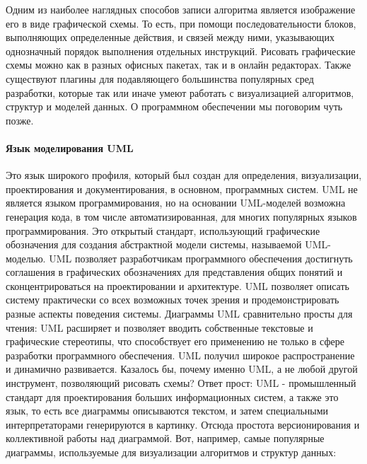 \documentclass[fontsize=14bp]{report}
\begin{document}
Одним из наиболее наглядных способов записи алгоритма является изображение его в виде графической схемы. То есть, при помощи последовательности блоков, выполняющих определенные действия, и связей между ними, указывающих однозначный порядок выполнения отдельных инструкций. Рисовать графические схемы можно как в разных офисных пакетах, так и в онлайн редакторах. Также существуют плагины для подавляющего большинства популярных сред разработки, которые так или иначе умеют работать с визуализацией алгоритмов, структур и моделей данных. О программном обеспечении мы поговорим чуть позже.
\paragraph{Язык моделирования UML} Это язык широкого профиля, который был создан для определения, визуализации, проектирования и документирования, в основном, программных систем. UML не является языком программирования, но на основании UML-моделей возможна генерация кода, в том числе автоматизированная, для многих популярных языков программирования. Это открытый стандарт, использующий графические обозначения для создания абстрактной модели системы, называемой UML-моделью. UML позволяет разработчикам программного обеспечения достигнуть соглашения в графических обозначениях для представления общих понятий и сконцентрироваться на проектировании и архитектуре. 
UML позволяет описать систему практически со всех возможных точек зрения и продемонстрировать разные аспекты поведения системы. Диаграммы UML сравнительно просты для чтения: UML расширяет и позволяет вводить собственные текстовые и графические стереотипы, что способствует его применению не только в сфере разработки программного обеспечения. UML получил широкое распространение и динамично развивается. Казалось бы, почему именно UML, а не любой другой инструмент, позволяющий рисовать схемы? Ответ прост: UML - промышленный стандарт для проектирования больших информационных систем, а также это язык, то есть все диаграммы описываются текстом, и затем специальными интерпретаторами генерируются в картинку. Отсюда простота версионирования и коллективной работы над диаграммой. Вот, например, самые популярные диаграммы, используемые для визуализации алгоритмов и структур данных:
\end{document}
